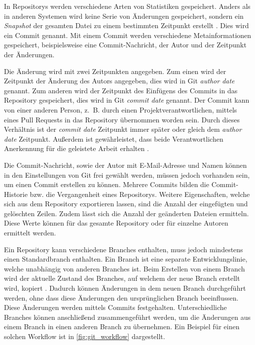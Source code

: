 In Repositorys werden verschiedene Arten von Statistiken gespeichert.
Anders als in anderen Systemen wird keine Serie von Änderungen gespeichert, sondern ein \emph{Snapshot} der gesamten Datei zu einem bestimmten Zeitpunkt erstellt \autocite{ponuthorai_version_2022}.
Dies wird ein Commit genannt.
Mit einem Commit werden verschiedene Metainformationen gespeichert, beispielsweise eine Commit-Nachricht, der Autor und der Zeitpunkt der Änderungen.

Die Änderung wird mit zwei Zeitpunkten angegeben.
Zum einen wird der Zeitpunkt der Änderung des Autors angegeben, dies wird in Git \emph{author date} genannt.
Zum anderen wird der Zeitpunkt des Einfügens des Commits in das Repository gespeichert, dies wird in Git \emph{commit date} genannt.
Der Commit kann von einer anderen Person, z.~B. durch einen Projektverantwortlichen, mittels eines Pull Requests in das Repository übernommen worden sein.
Durch dieses Verhältnis ist der \emph{commit date} Zeitpunkt immer später oder gleich dem \emph{author date} Zeitpunkt.
Außerdem ist gewährleistet, dass beide Verantwortlichen Anerkennung für die geleistete Arbeit erhalten \autocite{chacon_pro_2024}.

Die Commit-Nachricht, sowie der Autor mit E-Mail-Adresse und Namen können in den Einstellungen von Git frei gewählt werden, müssen jedoch vorhanden sein, um einen Commit erstellen zu können.
Mehrere Commits bilden die Commit-Historie bzw. die Vergangenheit eines Repositorys.
Weitere Eigenschaften, welche sich aus dem Repository exportieren lassen, sind die Anzahl der eingefügten und gelöschten Zeilen.
Zudem lässt sich die Anzahl der geänderten Dateien ermitteln.
Diese Werte können für das gesamte Repository oder für einzelne Autoren ermittelt werden.

Ein Repository kann verschiedene Branches enthalten, muss jedoch mindestens einen Standardbranch enthalten.
Ein Branch ist eine separate Entwicklungslinie, welche unabhängig von anderen Branches ist.
Beim Erstellen von einem Branch wird der aktuelle Zustand des Branches, auf welchem der neue Branch erstellt wird, kopiert \autocite{ponuthorai_version_2022}.
Dadurch können Änderungen in dem neuen Branch durchgeführt werden, ohne dass diese Änderungen den ursprünglichen Branch beeinflussen.
Diese Änderungen werden mittels Commits festgehalten.
Unterschiedliche Branches können anschließend zusammengeführt werden, um die Änderungen aus einem Branch in einen anderen Branch zu übernehmen.
Ein Beispiel für einen solchen Workflow ist in \autoref{fig:git_workflow} dargestellt.


